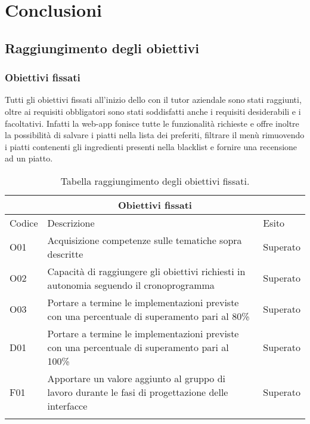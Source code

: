 
\chapter{Conclusioni}
\label{cap:conclusioni}
\section{Raggiungimento degli obiettivi}
\subsection{Obiettivi fissati}
Tutti gli obiettivi fissati all'inizio dello con il tutor aziendale sono stati raggiunti, oltre ai requisiti obbligatori sono stati soddisfatti anche i requisiti desiderabili e i facoltativi. Infatti la web-app fonisce tutte le funzionalità richieste e offre inoltre la possibilità di salvare i piatti nella lista dei preferiti, filtrare il menù rimuovendo i piatti contenenti gli ingredienti presenti nella blacklist e fornire una recensione ad un piatto.
\begin{center}
    \renewcommand{\arraystretch}{1.5}
    \begin{longtable}{ |p{1.5cm}|p{9cm}|p{2cm}|  }
        \hline
        \multicolumn{3}{|c|}{Obiettivi fissati} \\
        \hline
        Codice&Descrizione &Esito \\
        \hline
        \endhead
        O01&Acquisizione competenze sulle tematiche sopra descritte&Superato \\
        O02&Capacità di raggiungere gli obiettivi richiesti in autonomia seguendo il cronoprogramma&Superato\\
        O03&Portare a termine le implementazioni previste con una percentuale di superamento pari al 80\%&Superato\\
        D01&Portare a termine le implementazioni previste con una percentuale di superamento pari al 100\%&Superato\\
        F01&Apportare un valore aggiunto al gruppo di lavoro durante le fasi di progettazione delle interfacce&Superato\\
\hline
\caption{\label{tab:tabella raggiungimento obiettivi fissati}Tabella raggiungimento degli obiettivi fissati.}
\end{longtable}
\end{center}
\pagebreak

